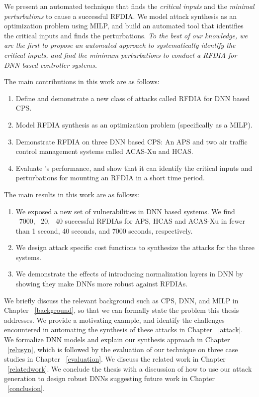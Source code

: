 We present an automated technique that finds the \textit{critical inputs} and the \textit{minimal perturbations} to cause a successful \ac{RFDIA}. 
We model attack synthesis as an optimization problem using \ac{MILP}, and build an automated tool \tool that identifies the critical inputs and finds the perturbations.
{\em To the best of our knowledge, we are the first to  propose an automated approach to systematically identify the critical inputs, and find the minimum perturbations to conduct a \ac{RFDIA} for DNN-based controller systems.}

The main contributions in this work are as follows:

\begin{enumerate}
	\item Define and demonstrate a new class of attacks called \ac{RFDIA} for \ac{DNN} based \ac{CPS}. 
	\item Model \ac{RFDIA} synthesis as an optimization problem (specifically as a \ac{MILP}). 
	\item Demonstrate \ac{RFDIA} on three \ac{DNN} based \ac{CPS}:  An \ac{APS} and two air traffic control management systems called \ac{ACAS-Xu} and \ac{HCAS}.
	\item Evaluate \tool's performance, and show that it can identify the critical inputs and perturbations for mounting an \ac{RFDIA} in a short time period.  
\end{enumerate}

The main results in this work are as follows:

\begin{enumerate}
	\item We exposed a new set of vulnerabilities in \ac{DNN} based systems. 
	 We find ~7000, ~20, ~40 successful \ac{RFDIA}s for \ac{APS}, \ac{HCAS} and \ac{ACAS-Xu} in fewer than 1 second, 40 seconds, and 7000 seconds, respectively. 
	\item We design attack specific cost functions to synthesize the attacks for the three systems.
	\item We demonstrate the effects of introducing normalization layers in \ac{DNN} by showing they make \ac{DNN}s more robust against \ac{RFDIA}s. 
\end{enumerate}

	
We briefly discuss the relevant background such as \ac{CPS}, \ac{DNN}, and \ac{MILP} in Chapter ~\ref{background}, so that we can formally state the problem this thesis addresses. 
We provide a motivating example, and identify the challenges encountered in automating the synthesis of these attacks in Chapter ~\ref{attack}.
We formalize \ac{DNN} models and explain our synthesis approach in Chapter ~\ref{relusyn}, which is followed by the evaluation of our technique on three case studies in Chapter ~\ref{evaluation}.
We discuss the related work in Chapter ~\ref{relatedwork}.
We conclude the thesis with a discussion of how to use our attack generation to design robust \ac{DNN}s suggesting future work in Chapter ~\ref{conclusion}.










